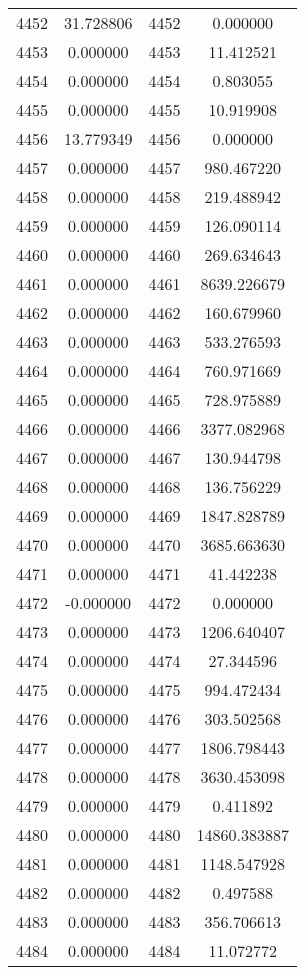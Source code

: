 \documentclass[12pt]{article}
\begin{document}
\begin{longtable}{@{}cccc@{}}
4452 & 31.728806 & 4452 & 0.000000 \\
4453 & 0.000000 & 4453 & 11.412521 \\
4454 & 0.000000 & 4454 & 0.803055 \\
4455 & 0.000000 & 4455 & 10.919908 \\
4456 & 13.779349 & 4456 & 0.000000 \\
4457 & 0.000000 & 4457 & 980.467220 \\
4458 & 0.000000 & 4458 & 219.488942 \\
4459 & 0.000000 & 4459 & 126.090114 \\
4460 & 0.000000 & 4460 & 269.634643 \\
4461 & 0.000000 & 4461 & 8639.226679 \\
4462 & 0.000000 & 4462 & 160.679960 \\
4463 & 0.000000 & 4463 & 533.276593 \\
4464 & 0.000000 & 4464 & 760.971669 \\
4465 & 0.000000 & 4465 & 728.975889 \\
4466 & 0.000000 & 4466 & 3377.082968 \\
4467 & 0.000000 & 4467 & 130.944798 \\
4468 & 0.000000 & 4468 & 136.756229 \\
4469 & 0.000000 & 4469 & 1847.828789 \\
4470 & 0.000000 & 4470 & 3685.663630 \\
4471 & 0.000000 & 4471 & 41.442238 \\
4472 & -0.000000 & 4472 & 0.000000 \\
4473 & 0.000000 & 4473 & 1206.640407 \\
4474 & 0.000000 & 4474 & 27.344596 \\
4475 & 0.000000 & 4475 & 994.472434 \\
4476 & 0.000000 & 4476 & 303.502568 \\
4477 & 0.000000 & 4477 & 1806.798443 \\
4478 & 0.000000 & 4478 & 3630.453098 \\
4479 & 0.000000 & 4479 & 0.411892 \\
4480 & 0.000000 & 4480 & 14860.383887 \\
4481 & 0.000000 & 4481 & 1148.547928 \\
4482 & 0.000000 & 4482 & 0.497588 \\
4483 & 0.000000 & 4483 & 356.706613 \\
4484 & 0.000000 & 4484 & 11.072772 \\

\end{longtable}
\end{document}
